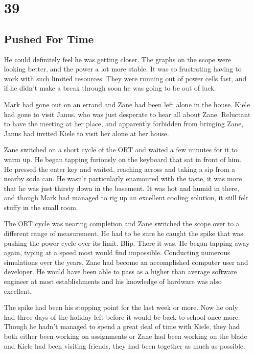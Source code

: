 \chapter{39}
\section{Pushed For Time}


He could definitely feel he was getting closer.  The graphs on the scope were looking better, and the power a lot more stable.  It was so frustrating having to work with such limited resources.  They were running out of power cells fast, and if he didn't make a break through soon he was going to be out of luck.  

Mark had gone out on an errand and Zane had been left alone in the house.  Kiele had gone to visit Janus, who was just desperate to hear all about Zane.  Reluctant to have the meeting at her place, and apparently forbidden from bringing Zane, Janus had invited Kiele to visit her alone at her house.

Zane switched on a short cycle of the ORT and waited a few minutes for it to warm up.  He began tapping furiously on the keyboard that sat in front of him.  He pressed the enter key and waited, reaching across and taking a sip from a nearby soda can.  He wasn't particularly enamoured with the taste, it was more that he was just thirsty down in the basement.  It was hot and humid in there, and though Mark had managed to rig up an excellent cooling solution, it still felt stuffy in the small room.

The ORT cycle was nearing completion and Zane switched the scope over to a different range of measurement.  He had to be sure he caught the spike that was pushing the power cycle over its limit.  Blip.  There it was.  He began tapping away again, typing at a speed most would find impossible.  Conducting numerous simulations over the years, Zane had become an accomplished computer user and developer.  He would have been able to pass as a higher than average software engineer at most establishments and his knowledge of hardware was also excellent.  

The spike had been his stopping point for the last week or more.  Now he only had three days of the holiday left before it would be back to school once more.  Though he hadn't managed to spend a great deal of time with Kiele, they had both either been working on assignments or Zane had been working on the blade and Kiele had been visiting friends, they had been together as much as possible.

